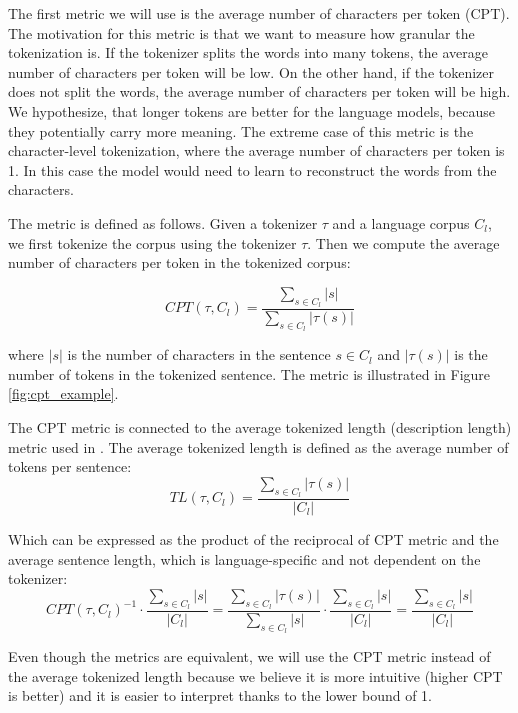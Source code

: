 The first metric we will use is the average number of characters per token (CPT). The motivation for this metric is that we want to measure how granular the tokenization is. If the tokenizer splits the words into many tokens, the average number of characters per token will be low. On the other hand, if the tokenizer does not split the words, the average number of characters per token will be high. We hypothesize, that longer tokens are better for the language models, because they potentially carry more meaning. The extreme case of this metric is the character-level tokenization, where the average number of characters per token is 1. In this case the model would need to learn to reconstruct the words from the characters.

The metric is defined as follows. Given a tokenizer $\tau$ and a language corpus $C_l$, we first tokenize the corpus using the tokenizer $\tau$. Then we compute the average number of characters per token in the tokenized corpus:

\begin{equation}
    CPT(\tau, C_l) = \frac{\sum_{s \in C_l}|s|}{\sum_{s \in C_l}|\tau(s)|}
\end{equation}

where $|s|$ is the number of characters in the sentence $s \in C_l$ and $|\tau(s)|$ is the number of tokens in the tokenized sentence. The metric is illustrated in Figure \ref{fig:cpt_example}.

The CPT metric is connected to the average tokenized length (description length) metric used in \citet{chung_improving_2020,liang_xlm-v_2023}. The average tokenized length is defined as the average number of tokens per sentence: 
\begin{equation}
    TL(\tau, C_l) = \frac{\sum_{s \in C_l}|\tau(s)|}{|C_l|}
\end{equation}

Which can be expressed as the product of the reciprocal of CPT metric and the average sentence length, which is language-specific and not dependent on the tokenizer:
\begin{equation}
    CPT(\tau, C_l)^{-1} \cdot \frac{\sum_{s \in C_l}|s|}{|C_l|} = \frac{\sum_{s \in C_l}|\tau(s)|}{\sum_{s \in C_l}|s|} \cdot \frac{\sum_{s \in C_l}|s|}{|C_l|} = \frac{\sum_{s \in C_l}|s|}{|C_l|}
\end{equation}

Even though the metrics are equivalent, we will use the CPT metric instead of the average tokenized length because we believe it is more intuitive (higher CPT is better) and it is easier to interpret thanks to the lower bound of 1.

